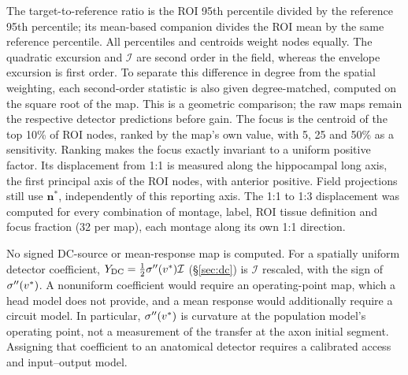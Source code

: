 The target-to-reference ratio is the ROI 95th percentile divided by the reference
95th percentile; its mean-based companion divides the ROI mean by the same
reference percentile. All percentiles and centroids weight nodes equally.
The quadratic excursion and $\mathcal I$ are second order in the field, whereas
the envelope excursion is first order. To separate this difference in degree
from the spatial weighting, each second-order statistic is also given
degree-matched, computed on the square root of the map. This is a geometric
comparison; the raw maps remain the respective detector predictions before gain.
The focus is the centroid of the top 10\% of ROI nodes,
ranked by the map's own value, with 5, 25 and 50\% as a sensitivity. Ranking makes the
focus exactly invariant to a uniform positive factor. Its displacement from 1:1 is
measured along the hippocampal long axis, the first principal axis of the ROI nodes,
with anterior positive. Field projections still use $\mathbf n^*$, independently
of this reporting axis. The 1:1 to 1:3 displacement was computed for every combination
of montage, label, ROI tissue definition and focus fraction (32 per map), each montage
along its own 1:1 direction.

No signed DC-source or mean-response map is computed. For a spatially uniform detector
coefficient, $Y_{\rm DC}=\tfrac12\sigma''(v^*)\mathcal I$ (\S\ref{sec:dc}) is
$\mathcal I$ rescaled, with the sign of $\sigma''(v^*)$. A nonuniform coefficient would
require an operating-point map, which a head model does not provide, and a mean
response would additionally require a circuit model. In particular,
$\sigma''(v^*)$ is curvature at the population model's operating point, not a
measurement of the transfer at the axon initial segment. Assigning that
coefficient to an anatomical detector requires a calibrated access and
input--output model.
